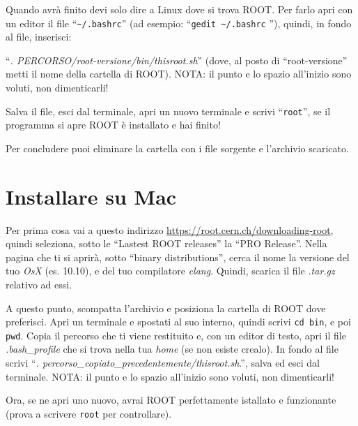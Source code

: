 Quando avrà finito devi solo dire a Linux dove si trova ROOT. Per farlo apri con un editor il file ``\verb|~/.bashrc|'' (ad esempio: ``\verb|gedit ~/.bashrc| ''), quindi, in fondo al file, inserisci:

``\emph{. PERCORSO/root-versione/bin/thisroot.sh}'' (dove, al posto di ``root-versione'' metti il nome della cartella di ROOT). NOTA: il punto e lo spazio all'inizio sono voluti, non dimenticarli!

Salva il file, esci dal terminale, apri un nuovo terminale e scrivi ``\verb|root|'', se il programma si apre ROOT è installato e hai finito!

Per concludere puoi eliminare la cartella con i file sorgente e l'archivio scaricato.
\section{Installare su Mac}\label{instmac}
Per prima cosa vai a questo indirizzo \url{https://root.cern.ch/downloading-root}, quindi seleziona, sotto le ``Lastest ROOT releases'' la ``PRO Release''. Nella pagina che ti si aprirà, sotto ``binary distributions'', cerca il nome la versione del tuo \emph{OsX} (es. 10.10), e del tuo compilatore \emph{clang}. Quindi, scarica il file \emph{.tar.gz} relativo ad essi. 

A questo punto, scompatta l'archivio e posiziona la cartella di ROOT dove preferisci. Apri un terminale e spostati al suo interno, quindi scrivi \verb|cd bin|, e poi \verb|pwd|. Copia il percorso che ti viene restituito e, con un editor di testo, apri il file \emph{.bash\_profile} che si trova nella tua \emph{home} (se non esiste crealo). In fondo al file scrivi ``\emph{. percorso\_copiato\_precedentemente/thisroot.sh}.'', salva ed esci dal terminale.  NOTA: il punto e lo spazio all'inizio sono voluti, non dimenticarli!

Ora, se ne apri uno nuovo, avrai ROOT perfettamente istallato e funzionante (prova a scrivere \verb|root| per controllare).